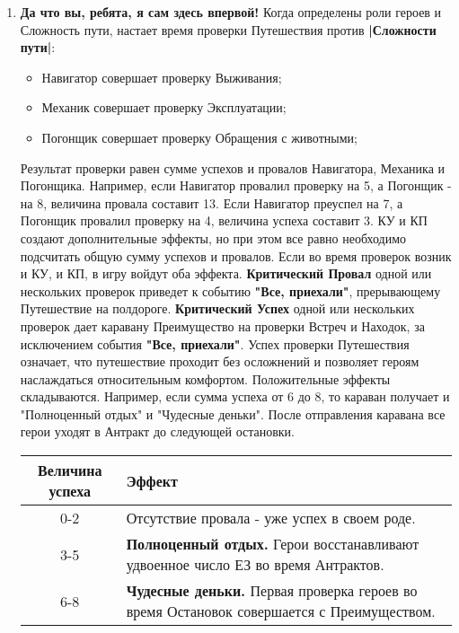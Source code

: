 \begin{enumerate}
  \item \textbf{Да что вы, ребята, я сам здесь впервой!} Когда определены роли героев и Сложность пути, настает время проверки Путешествия против \textbf{|Сложности пути|}:
    \begin{itemize}
      \item Навигатор совершает проверку Выживания;
      \item Механик совершает проверку Эксплуатации;
      \item Погонщик совершает проверку Обращения с животными;
    \end{itemize}
    Результат проверки равен сумме успехов и провалов Навигатора, Механика и Погонщика. Например, если Навигатор провалил проверку на 5, а Погонщик - на 8, величина провала составит 13. Если Навигатор преуспел на 7, а Погонщик провалил проверку на 4, величина успеха составит 3.
    \newline КУ и КП создают дополнительные эффекты, но при этом все равно необходимо подсчитать общую сумму успехов и провалов. Если во время проверок возник и КУ, и КП, в игру войдут оба эффекта.
    \newline \textbf{Критический Провал} одной или нескольких проверок приведет к событию \textbf{"Все, приехали"}, прерывающему Путешествие на полдороге.  
    \newline \textbf{Критический Успех} одной или нескольких проверок дает каравану Преимущество на проверки Встреч и Находок, за \newline исключением события \textbf{"Все, приехали"}.
    \newline Успех проверки Путешествия означает, что путешествие проходит без осложнений и позволяет героям наслаждаться относительным комфортом. Положительные эффекты складываются. Например, если сумма успеха от 6 до 8, то караван получает и "Полноценный отдых" и "Чудесные деньки".
    \newline После отправления каравана все герои уходят в Антракт до следующей остановки.
    \begin{center} \begin{tabular}{|c|p{10cm}|} \hline
      \textbf{Величина успеха} & \textbf{Эффект} \\ \hline
      0-2 & Отсутствие провала - уже успех в своем роде. \\ \hline
      3-5 & \textbf{Полноценный отдых.} Герои восстанавливают удвоенное число ЕЗ во время Антрактов. \\ \hline
      6-8 & \textbf{Чудесные деньки.} Первая проверка героев во время Остановок совершается с Преимуществом. \\ \hline

\end{tabular}
\end{center}
\end{enumerate}
